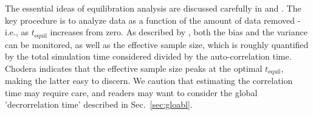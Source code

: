 The essential ideas of equilibration analysis are discussed carefully in \cite{Yang2004} and \cite{Chodera-2016}.
The key procedure is to analyze data as a function of the amount of data removed - i.e., as $t_{\mathrm{equil}}$ increases from zero.
As described by \cite{Chodera-2016}, both the bias and the variance can be monitored, as well as the effective sample size, which is roughly quantified by the total simulation time considered divided by the auto-correlation time.
Chodera indicates that the effective sample size peaks at the optimal $t_{\mathrm{equil}}$, making the latter easy to discern.
We caution that estimating the correlation time may require care, and readers may want to consider the global 'decrorrelation time' \cite{Lyman2007a} described in Sec.\ \ref{sec:gloabl}.
